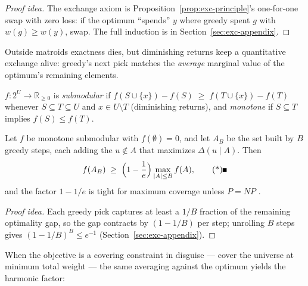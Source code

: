 \begin{proof}[Proof idea]
The exchange axiom is Proposition~\ref{prop:exc-principle}'s one-for-one swap with
zero loss: if the optimum ``spends'' $y$ where greedy spent $g$ with $w(g)\ge w(y)$,
swap. The full induction is in Section~\ref{sec:exc-appendix}.
\end{proof}


Outside matroids exactness dies, but diminishing returns keep a quantitative exchange
alive: greedy's next pick matches the \emph{average} marginal value of the optimum's
remaining elements.

\begin{definition}\label{def:exc-submodular}
$f\colon 2^U\to\mathbb{R}_{\ge 0}$ is \emph{submodular} if
$f(S\cup\{x\}) - f(S) \;\ge\; f(T\cup\{x\}) - f(T)$ whenever $S\subseteq T\subseteq U$
and $x\in U\setminus T$ (diminishing returns), and \emph{monotone} if $S\subseteq T$
implies $f(S)\le f(T)$.
\end{definition}

\begin{theorem}\label{thm:exc-nwf}
Let $f$ be monotone submodular with $f(\emptyset)=0$, and let $A_B$ be the set built
by $B$ greedy steps, each adding the $u\notin A$ that maximizes $\Delta(u\mid A)$.
Then
\[
f(A_B) \;\ge\; \Bigl(1-\frac{1}{e}\Bigr)\max_{|A|\le B} f(A), \eopm
\]
and the factor $1-1/e$ is tight for maximum coverage unless $P=NP$
\citep{exchange-greedy-bg2,exchange-greedy-bg5}.
\end{theorem}

\begin{proof}[Proof idea]
Each greedy pick captures at least a $1/B$ fraction of the remaining optimality gap,
so the gap contracts by $(1-1/B)$ per step; unrolling $B$ steps gives
$(1-1/B)^{B}\le e^{-1}$ (Section~\ref{sec:exc-appendix}).
\end{proof}

When the objective is a covering constraint in disguise --- cover the universe at
minimum total weight --- the same averaging against the optimum yields the harmonic
factor:

